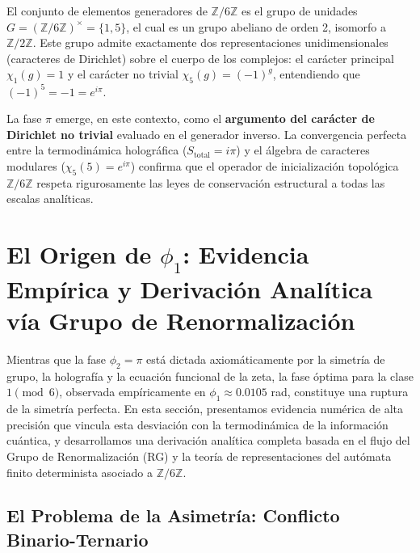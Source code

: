\documentclass[12pt,a4paper]{article}
\theoremstyle{plain}
\theoremstyle{definition}
\theoremstyle{remark}
\begin{document}
El conjunto de elementos generadores de $\mathbb{Z}/6\mathbb{Z}$ es el grupo de unidades $G = (\mathbb{Z}/6\mathbb{Z})^{\times} = \{1,5\}$, el cual es un grupo abeliano de orden 2, isomorfo a $\mathbb{Z}/2\mathbb{Z}$. Este grupo admite exactamente dos representaciones unidimensionales (caracteres de Dirichlet) sobre el cuerpo de los complejos: el carácter principal $\chi_1(g) = 1$ y el carácter no trivial $\chi_5(g) = (-1)^g$, entendiendo que $(-1)^5 = -1 = e^{i\pi}$.

La fase $\pi$ emerge, en este contexto, como el \textbf{argumento del carácter de Dirichlet no trivial} evaluado en el generador inverso. La convergencia perfecta entre la termodinámica holográfica ($S_{\text{total}} = i\pi$) y el álgebra de caracteres modulares ($\chi_5(5) = e^{i\pi}$) confirma que el operador de inicialización topológica $\mathbb{Z}/6\mathbb{Z}$ respeta rigurosamente las leyes de conservación estructural a todas las escalas analíticas.

\section{El Origen de $\phi_1$: Evidencia Empírica y Derivación Analítica vía Grupo de Renormalización}
\label{sec:origen_phi1}

Mientras que la fase $\phi_2 = \pi$ está dictada axiomáticamente por la simetría de grupo, la holografía y la ecuación funcional de la zeta, la fase óptima para la clase $1 \pmod 6$, observada empíricamente en $\phi_1 \approx 0.0105$ rad, constituye una ruptura de la simetría perfecta. En esta sección, presentamos evidencia numérica de alta precisión que vincula esta desviación con la termodinámica de la información cuántica, y desarrollamos una derivación analítica completa basada en el flujo del Grupo de Renormalización (RG) y la teoría de representaciones del autómata finito determinista asociado a $\mathbb{Z}/6\mathbb{Z}$.

\subsection{El Problema de la Asimetría: Conflicto Binario-Ternario}
\end{document}
